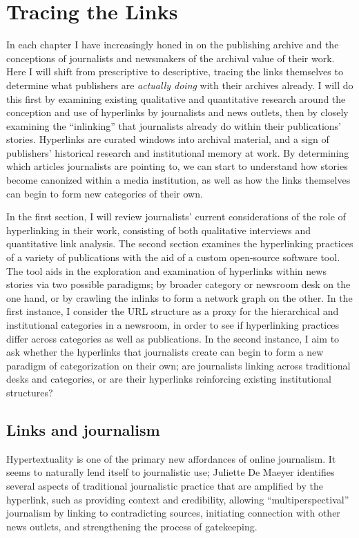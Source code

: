 \chapter{Tracing the Links}

In each chapter I have increasingly honed in on the publishing archive and the conceptions of journalists and newsmakers of the archival value of their work. Here I will shift from prescriptive to descriptive, tracing the links themselves to determine what publishers are \emph{actually doing} with their archives already. I will do this first by examining existing qualitative and quantitative research around the conception and use of hyperlinks by journalists and news outlets, then by closely examining the ``inlinking'' that journalists already do within their publications' stories. Hyperlinks are curated windows into archival material, and a sign of publishers' historical research and institutional memory at work. By determining which articles journalists are pointing to, we can start to understand how stories become canonized within a media institution, as well as how the links themselves can begin to form new categories of their own.

In the first section, I will review journalists' current considerations of the role of hyperlinking in their work, consisting of both qualitative interviews and quantitative link analysis. The second section examines the hyperlinking practices of a variety of publications with the aid of a custom open-source software tool. The tool aids in the exploration and examination of hyperlinks within news stories via two possible paradigms; by broader category or newsroom desk on the one hand, or by crawling the inlinks to form a network graph on the other. In the first instance, I consider the URL structure as a proxy for the hierarchical and institutional categories in a newsroom, in order to see if hyperlinking practices differ across categories as well as publications. In the second instance, I aim to ask whether the hyperlinks that journalists create can begin to form a new paradigm of categorization on their own; are journalists linking across traditional desks and categories, or are their hyperlinks reinforcing existing institutional structures?

\section{Links and journalism}

Hypertextuality is one of the primary new affordances of online journalism.\autocite[See][]{deuze_web_2003,de_maeyer_towards_2013,oblak_lack_2005} It seems to naturally lend itself to journalistic use; Juliette De Maeyer identifies several aspects of traditional journalistic practice that are amplified by the hyperlink, such as providing context and credibility, allowing ``multiperspectival'' journalism by linking to contradicting sources, initiating connection with other news outlets, and strengthening the process of gatekeeping.\autocite[9-10]{de_maeyer_methods_2010}

